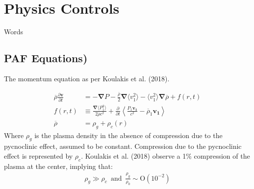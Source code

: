 \clearpage
\newcommand{\rhobar}{\overline{\rho}}
\newcommand{\vvec}{\boldsymbol{v}}
\newcommand{\rhat}{\boldsymbol{\hat{r}}}
\newcommand{\shat}{\boldsymbol{\hat{s}}}
\section{Physics Controls}\label{sec:physics}
Words

\subsection{PAF Equations)}

The momentum equation as per Koulakis et al. (2018).

\begin{align*}
\rhobar\frac{ \partial \boldsymbol{v} }{\partial t}  &=    -\boldsymbol{\nabla}P  %
						        - \frac{\rhobar}{2}\boldsymbol{\nabla}\langle v_1^2\rangle
							- \langle v_1^2\rangle\boldsymbol{\nabla}\rhobar
							+ f(r,t) \\
f(r,t) &\equiv \frac{\boldsymbol{\nabla}\langle P_1^2 \rangle}{2\rhobar c^2}+\frac{\partial}{\partial t}\left\langle \frac{P_1\boldsymbol{v_1}}{c^2} -\rhobar_1 \boldsymbol{v_1} \right\rangle \\
\rhobar &= \rho_g+\rho_c(r)
\end{align*}
Where $\rho_g$ is the plasma density in the absence of compression due to the pycnoclinic effect, assumed to be constant.   Compression due to the pycnoclinic effect is represented by $\rho_c$.   Koulakis et al. (2018) observe a 1\% compression of the plasma at the center, implying that:
\begin{align*}
\rho_g \gg \rho_c \,\,\,\mathrm{and}\,\,\,
\frac{\rho_g}{\rho_0}\sim \mathrm{O}(10^{-2})
\end{align*}

